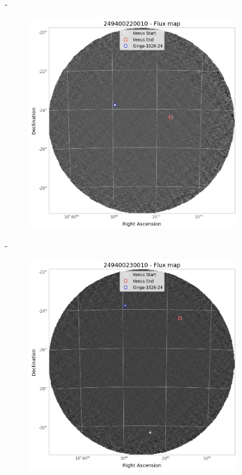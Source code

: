 \documentclass[
	a4paper, %
	10pt, %
	unnumberedsections, %
	twoside, %
]{LTJournalArticle}
\begin{document}
\begin{figure}[H]
\begin{subfigure}{.3\textwidth}
        \end{subfigure}
        \hspace{1em}-
        \begin{subfigure}{.3\textwidth}
            \centering
            \includegraphics[width=\textwidth]{report/Figures/methods/2204/22_map.png}
        \end{subfigure}
        \hspace{1em}-
        \begin{subfigure}{.3\textwidth}
            \centering
            \includegraphics[width=\textwidth]{report/Figures/methods/2204/23_map.png}

\end{subfigure}
\end{figure}
\end{document}

